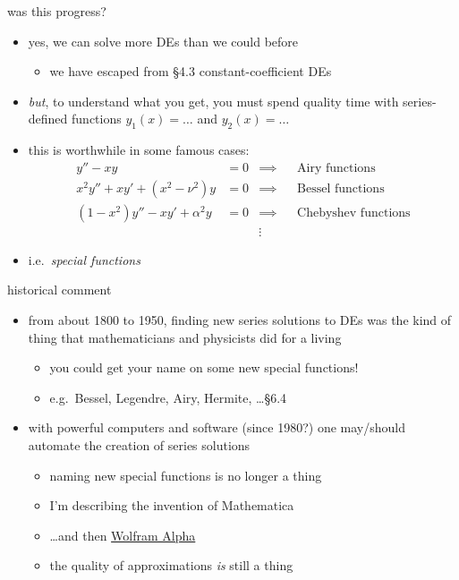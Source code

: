 \documentclass[urlcolor=blue,dvipsnames]{beamer}
\begin{document}
\begin{frame}{was this progress?}

\begin{itemize}
\item yes, we can solve more DEs than we could before
    \begin{itemize}
    \item \alert{we have escaped from \S4.3 constant-coefficient DEs}
    \end{itemize}
\item \emph{but}, to understand what you get, you must spend quality time with series-defined functions $y_1(x)=\dots$ and $y_2(x)=\dots$
\item this is worthwhile in some famous cases:
\begin{align*}
y''-xy &= 0 &\implies &&\text{Airy functions} \\
x^2 y'' + xy' + (x^2-\nu^2) y &= 0 &\implies &&\text{Bessel functions} \\
(1-x^2) y'' - xy' + \alpha^2 y &= 0 &\implies &&\text{Chebyshev functions} \\
 &&\vdots &&
\end{align*}
\item i.e.~\emph{special functions}
\end{itemize}
\end{frame}


\begin{frame}{historical comment}

\begin{itemize}
\item from about 1800 to 1950, finding new series solutions to DEs was the kind of thing that mathematicians and physicists did for a living
    \begin{itemize}
    \item you could get your name on some new special functions!
    \item e.g.~Bessel, Legendre, Airy, Hermite, \dots \S 6.4
    \end{itemize}
\item with powerful computers and software (since 1980?) one may/should automate the creation of series solutions
    \begin{itemize}
    \item naming new special functions is no longer a thing
    \item I'm describing the invention of Mathematica
    \item \dots and then \href{https://www.wolframalpha.com/}{Wolfram Alpha}
    \item the quality of approximations \emph{is} still a thing
    \end{itemize}
\end{itemize}
\end{frame}
\end{document}
